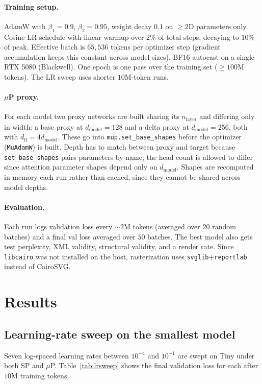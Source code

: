 \documentclass[11pt]{article}
\begin{document}
\paragraph{Training setup.}
AdamW with $\beta_1\!=\!0.9$, $\beta_2\!=\!0.95$, weight decay $0.1$ on $\geq\!2$D parameters only. Cosine LR schedule with linear warmup over $2\%$ of total steps, decaying to $10\%$ of peak. Effective batch is $65{,}536$ tokens per optimizer step (gradient accumulation keeps this constant across model sizes). BF16 autocast on a single RTX 5080 (Blackwell). One epoch is one pass over the training set ($\geq\!100$M tokens). The LR sweep uses shorter $10$M-token runs.

\paragraph{$\mu$P proxy.}
For each model two proxy networks are built sharing its $n_{\text{layer}}$ and differing only in width: a base proxy at $d_{\text{model}}\!=\!128$ and a delta proxy at $d_{\text{model}}\!=\!256$, both with $d_{\text{ff}}\!=\!4 d_{\text{model}}$. These go into \texttt{mup.set\_base\_shapes} before the optimizer (\texttt{MuAdamW}) is built. Depth has to match between proxy and target because \texttt{set\_base\_shapes} pairs parameters by name; the head count is allowed to differ since attention parameter shapes depend only on $d_{\text{model}}$. Shapes are recomputed in memory each run rather than cached, since they cannot be shared across model depths.

\paragraph{Evaluation.}
Each run logs validation loss every $\sim\!2$M tokens (averaged over $20$ random batches) and a final val loss averaged over $50$ batches. The best model also gets test perplexity, XML validity, structural validity, and a render rate. Since \texttt{libcairo} was not installed on the host, rasterization uses \texttt{svglib}$+$\texttt{reportlab} instead of CairoSVG.

\section{Results}
\subsection{Learning-rate sweep on the smallest model}
Seven log-spaced learning rates between $10^{-4}$ and $10^{-1}$ are swept on Tiny under both SP and $\mu$P. Table~\ref{tab:lrsweep} shows the final validation loss for each after $10$M training tokens.
\end{document}
